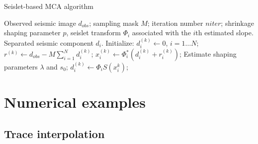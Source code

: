 
\begin{algorithm}[htb]
    \caption{Seislet-based MCA algorithm}
    \begin{algorithmic}[1]
    \renewcommand{\algorithmicrequire}{\textbf{Input:}}
    \REQUIRE Observed seismic image $d_{obs}$; sampling mask $M$; iteration number $niter$; shrinkage shaping parameter $p$, seislet transform $\Phi_i$  associated with the $i$th estimated slope.
    \renewcommand{\algorithmicensure}{\textbf{Output:}}
    \ENSURE Separated seismic component $d_i$.
    \STATE Initialize: $d_i^{(k)}\leftarrow 0$, $ i=1\ldots N$;
            \STATE  $r^{(k)} \leftarrow d_{obs}-M\sum_{i=1}^N d_i^{(k)}$;
                \STATE  $x_i^{(k)}\leftarrow \Phi_i^*(d_i^{(k)}+r_i^{(k)})$;
                \STATE  Estimate shaping parameters $\lambda$ and $s_0$;
                \STATE  $d_i^{(k)}\leftarrow \Phi_i S(x_i^k) $;
            \ENDFOR
        \ENDFOR
    \end{algorithmic}
\end{algorithm}

\section{Numerical examples}

\subsection{Trace interpolation}


